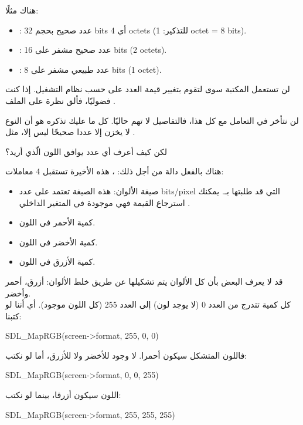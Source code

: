 هناك مثلًا:

\begin{itemize}
	\item {}:
عدد صحيح بحجم
\textenglish{32 bits}
أي
\textenglish{4 octets}
(للتذكير:
\textenglish{1 octet = 8 bits}).
	\item {}:
عدد صحيح مشفر على
\textenglish{16 bits} (\textenglish{2 octets}).
	\item {}:
عدد طبيعي مشفر على
\textenglish{8 bits} (\textenglish{1 octet}).
\end{itemize}
لن تستعمل المكتبة سوى
لتقوم بتغيير قيمة العدد على حسب نظام التشغيل. إذا كنت فضوليًا، فألق نظرة على الملف
.

لن نتأخر في التعامل مع كل هذا، فالتفاصيل لا تهم حاليًا. كل ما عليك تذكره هو أن النوع
لا يخزن إلا عددا صحيحًا ليس إلا، مثل
.

\begin{question}
لكن كيف أعرف أي عدد يوافق اللون الّذي أريد؟
\end{question}

هناك بالفعل دالة من أجل ذلك:
،
هذه الأخيرة تستقبل 4 معاملات:

\begin{itemize}
	\item صيغة الألوان: هذه الصيغة تعتمد على عدد
	\textenglish{bits/pixel}
	التي قد طلبتها بـ.
	يمكنك استرجاع القيمة فهي موجودة في المتغير الداخلي
	.
	\item كمية الأحمر في اللون.
	\item كمية الأخضر في اللون.
	\item كمية الأزرق في اللون.
\end{itemize}

قد لا يعرف البعض بأن كل الألوان يتم تشكيلها عن طريق خلط الألوان: أزرق، أحمر وأخضر.\\
كل كمية تتدرج من العدد 0 (لا يوجد لون) إلى العدد 255 (كل اللون موجود). أي أننا لو كتبنا:

\begin{Csource}
SDL_MapRGB(screen->format, 255, 0, 0)
\end{Csource}

فاللون المتشكل سيكون أحمرا. لا وجود للأخضر ولا للأزرق، أما لو نكتب:
\begin{Csource}
SDL_MapRGB(screen->format, 0, 0, 255)
\end{Csource}
اللون سيكون أزرقا، بينما لو نكتب:
\begin{Csource}
SDL_MapRGB(screen->format, 255, 255, 255)
\end{Csource}

